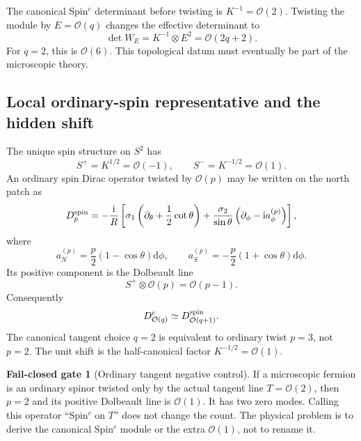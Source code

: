 \documentclass[11pt]{article}
\theoremstyle{definition}
\newtheorem{gate}[theorem]{Fail-closed gate}
\theoremstyle{remark}
\newcommand{\ii}{\mathrm i}
\newcommand{\dd}{\mathrm d}
\newcommand{\cO}{\mathcal O}
\begin{document}
The canonical Spin\({}^c\) determinant before twisting is
\(K^{-1}=\cO(2)\).  Twisting the module by \(E=\cO(q)\) changes the effective
determinant to
\begin{equation}
 \det W_E=K^{-1}\otimes E^2=\cO(2q+2).
 \label{eq:spinc-determinant}
\end{equation}
For \(q=2\), this is \(\cO(6)\).  This topological datum must eventually be
part of the microscopic theory.

\subsection{Local ordinary-spin representative and the hidden shift}

The unique spin structure on \(S^2\) has
\begin{equation}
 S^+=K^{1/2}=\cO(-1),\qquad S^-=K^{-1/2}=\cO(1).
 \label{eq:spin-bundles}
\end{equation}
An ordinary spin Dirac operator twisted by \(\cO(p)\) may be written on the
north patch as
\begin{equation}
 D_p^{\rm spin}=-\frac{\ii}{R}\left[
 \sigma_1\left(\partial_\theta+\frac12\cot\theta\right)
 +\frac{\sigma_2}{\sin\theta}
 \left(\partial_\phi-\ii a_\phi^{(p)}\right)
 \right],
 \label{eq:local-spin-dirac}
\end{equation}
where
\begin{equation}
 a_N^{(p)}=\frac p2(1-\cos\theta)\dd\phi,
 \qquad
 a_S^{(p)}=-\frac p2(1+\cos\theta)\dd\phi.
 \label{eq:op-connection}
\end{equation}
Its positive component is the Dolbeault line
\begin{equation}
 S^+\otimes\cO(p)=\cO(p-1).
 \label{eq:ordinary-effective-line}
\end{equation}
Consequently
\begin{equation}
 D^c_{\cO(q)}\simeq D^{\rm spin}_{\cO(q+1)}.
 \label{eq:spin-spinc-relation}
\end{equation}
The canonical tangent choice \(q=2\) is equivalent to ordinary twist
\(p=3\), not \(p=2\).  The unit shift is the half-canonical factor
\(K^{-1/2}=\cO(1)\).

\begin{gate}[Ordinary tangent negative control]
If a microscopic fermion is an ordinary spinor twisted only by the actual
tangent line \(T=\cO(2)\), then \(p=2\) and its positive Dolbeault line is
\(\cO(1)\).  It has two zero modes.  Calling this operator
``Spin\({}^c\) on \(T\)'' does not change the count.  The physical problem is
to derive the canonical Spin\({}^c\) module or the extra \(\cO(1)\), not to
rename it.
\end{gate}
\end{document}
